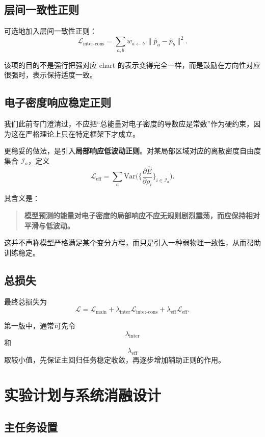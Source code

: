 \documentclass[12pt,a4paper]{ctexart}
\begin{document}
\subsection{层间一致性正则}

可选地加入层间一致性正则：
\[
\mathcal L_{\mathrm{inter\text{-}cons}}
=
\sum_{a,b}
\tilde w_{a\leftarrow b}\,
\|\hat p_a-\hat p_b\|^2.
\]

该项的目的不是强行把强对应 chart 的表示变得完全一样，而是鼓励在方向性对应很强时，表示保持适度一致。

\subsection{电子密度响应稳定正则}

我们此前专门澄清过，不应把“总能量对电子密度的导数应是常数”作为硬约束，因为这在严格理论上只在特定框架下才成立。

更稳妥的做法，是引入\textbf{局部响应低波动正则}。对某局部区域对应的离散密度自由度集合 \(\mathcal I_a\)，定义
\[
\mathcal L_{\mathrm{eff}}
=
\sum_a
\mathrm{Var}
\Big(
\Big\{
\frac{\partial \hat E}{\partial \rho_i}
\Big\}_{i\in\mathcal I_a}
\Big).
\]

其含义是：
\begin{quote}
\textbf{模型预测的能量对电子密度的局部响应不应无规则剧烈震荡，而应保持相对平滑与低波动。}
\end{quote}

这并不声称模型严格满足某个变分方程，而只是引入一种弱物理一致性，从而帮助训练稳定。

\subsection{总损失}

最终总损失为
\[
\mathcal L
=
\mathcal L_{\mathrm{main}}
+
\lambda_{\mathrm{inter}}
\mathcal L_{\mathrm{inter\text{-}cons}}
+
\lambda_{\mathrm{eff}}
\mathcal L_{\mathrm{eff}}.
\]

第一版中，通常可先令
\[
\lambda_{\mathrm{inter}}
\]
和
\[
\lambda_{\mathrm{eff}}
\]
取较小值，先保证主回归任务稳定收敛，再逐步增加辅助正则的作用。

\section{实验计划与系统消融设计}

\subsection{主任务设置}
\end{document}
